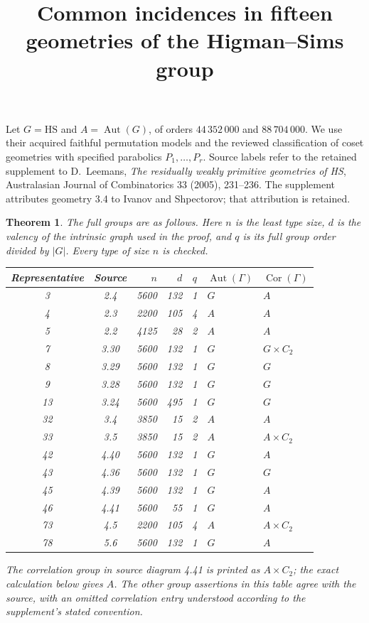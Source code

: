 \documentclass[11pt]{article}
\title{Common incidences in fifteen geometries of the Higman--Sims group}
\author{}\date{}
\newtheorem{theorem}{Theorem}\newtheorem{lemma}[theorem]{Lemma}
\newcommand{\Aut}{\operatorname{Aut}}\newcommand{\Cor}{\operatorname{Cor}}
\begin{document}
\maketitle
Let $G=\mathrm{HS}$ and $A=\Aut(G)$, of orders $44\,352\,000$ and
$88\,704\,000$. We use their acquired faithful permutation models and
the reviewed classification of coset geometries with specified parabolics
$P_1,\ldots,P_r$. Source labels refer to the retained supplement to
D.~Leemans, \emph{The residually weakly primitive geometries of HS},
Australasian Journal of Combinatorics 33 (2005), 231--236. The supplement
attributes geometry 3.4 to Ivanov and Shpectorov; that attribution is retained.

\begin{theorem}
The full groups are as follows. Here $n$ is the least type size, $d$ is the
valency of the intrinsic graph used in the proof, and $q$ is its full group
order divided by $|G|$. Every type of size $n$ is checked.
\begin{center}
\begin{tabular}{ccrrcll}\toprule
Representative&Source&$n$&$d$&$q$&$\Aut(\Gamma)$&$\Cor(\Gamma)$\\\midrule
3&2.4&5600&132&1&$G$&$A$\\
4&2.3&2200&105&4&$A$&$A$\\
5&2.2&4125&28&2&$A$&$A$\\
7&3.30&5600&132&1&$G$&$G\times C_2$\\
8&3.29&5600&132&1&$G$&$G$\\
9&3.28&5600&132&1&$G$&$G$\\
13&3.24&5600&495&1&$G$&$G$\\
32&3.4&3850&15&2&$A$&$A$\\
33&3.5&3850&15&2&$A$&$A\times C_2$\\
42&4.40&5600&132&1&$G$&$A$\\
43&4.36&5600&132&1&$G$&$G$\\
45&4.39&5600&132&1&$G$&$A$\\
46&4.41&5600&55&1&$G$&$A$\\
73&4.5&2200&105&4&$A$&$A\times C_2$\\
78&5.6&5600&132&1&$G$&$A$\\\bottomrule
\end{tabular}
\end{center}
The correlation group in source diagram 4.41 is printed as $A\times C_2$;
the exact calculation below gives $A$. The other group assertions in this
table agree with the source, with an omitted correlation entry understood
according to the supplement's stated convention.
\end{theorem}
\end{document}
